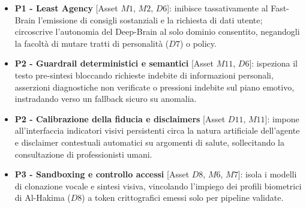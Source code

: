 \documentclass[11pt,a4paper]{article}
\begin{document}
\begin{itemize}
    \item \textbf{P1 - Least Agency} [Asset $M1$, $M2$, $D6$]:
    inibisce tassativamente al Fast-Brain l'emissione di consigli sostanziali e la richiesta di dati utente; circoscrive l'autonomia del Deep-Brain al solo dominio consentito, negandogli la facoltà di mutare tratti di personalità ($D7$) o policy.

    \item \textbf{P2 - Guardrail deterministici e semantici} [Asset $M11$, $D6$]:
    ispeziona il testo pre-sintesi bloccando richieste indebite di informazioni personali, asserzioni diagnostiche non verificate o pressioni indebite sul piano emotivo, instradando verso un fallback sicuro su anomalia.

    \item \textbf{P2 - Calibrazione della fiducia e disclaimers} [Asset $D11$, $M11$]:
    impone all'interfaccia indicatori visivi persistenti circa la natura artificiale dell'agente e disclaimer contestuali automatici su argomenti di salute, sollecitando la consultazione di professionisti umani.

    \item \textbf{P3 - Sandboxing e controllo accessi} [Asset $D8$, $M6$, $M7$]:
    isola i modelli di clonazione vocale e sintesi visiva, vincolando l'impiego dei profili biometrici di Al-Hakima ($D8$) a token crittografici emessi solo per pipeline validate.


\end{itemize}
\end{document}
